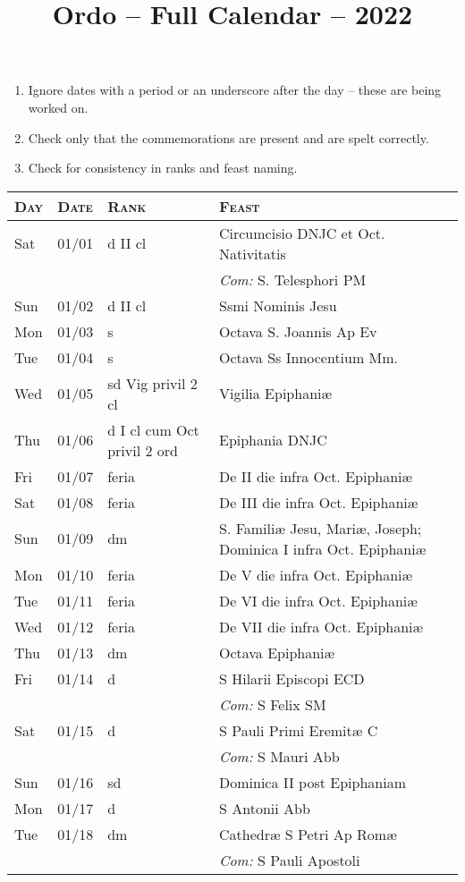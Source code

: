\documentclass[10pt]{article}
\title{Ordo -- Full Calendar -- 2022}
\begin{document}
\begin{enumerate}
    \item Ignore dates with a period or an underscore after the day -- these are being worked on.
    \item Check only that the commemorations are present and are spelt correctly.
    \item Check for consistency in ranks and feast naming.
\end{enumerate}
\begin{longtable}{ l l l l }
\hline
\textsc{Day} & \textsc{Date} & \textsc{Rank} & \textsc{Feast} \\
\hline
\endhead
Sat & 01/01 & d II cl & Circumcisio DNJC et Oct. Nativitatis\\
 & & & \textit{Com:} S. Telesphori PM\\
Sun & 01/02 & d II cl & Ssmi Nominis Jesu\\
Mon & 01/03 & s & Octava S. Joannis Ap Ev\\
Tue & 01/04 & s & Octava Ss Innocentium Mm.\\
Wed & 01/05 & sd Vig privil 2 cl & Vigilia Epiphaniæ\\
Thu & 01/06 & d I cl cum Oct privil 2 ord & Epiphania DNJC\\
Fri & 01/07 & feria & De II die infra Oct. Epiphaniæ\\
Sat & 01/08 & feria & De III die infra Oct. Epiphaniæ\\
Sun & 01/09 & dm & S. Familiæ Jesu, Mariæ, Joseph; Dominica I infra Oct. Epiphaniæ\\
Mon & 01/10 & feria & De V die infra Oct. Epiphaniæ\\
Tue & 01/11 & feria & De VI die infra Oct. Epiphaniæ\\
Wed & 01/12 & feria & De VII die infra Oct. Epiphaniæ\\
Thu & 01/13 & dm & Octava Epiphaniæ\\
Fri & 01/14 & d & S Hilarii Episcopi ECD\\
 & & & \textit{Com:} S Felix SM\\
Sat & 01/15 & d & S Pauli Primi Eremitæ C\\
 & & & \textit{Com:} S Mauri Abb\\
Sun & 01/16 & sd & Dominica II post Epiphaniam\\
Mon & 01/17 & d & S Antonii Abb\\
Tue & 01/18 & dm & Cathedræ S Petri Ap Romæ\\
 & & & \textit{Com:} S Pauli Apostoli\\

\end{longtable}
\end{document}
